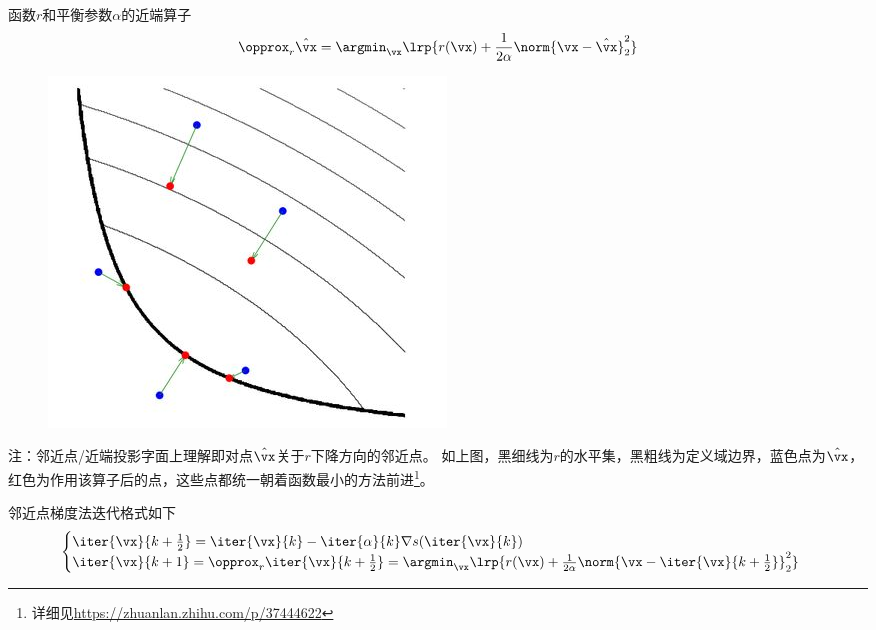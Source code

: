 \begin{definition}
    函数$r$和平衡参数$\alpha$的近端算子
\[\opprox_r \hat{\vx}=\argmin_\vx \lrp{r(\vx)+\frac{1}{2\alpha}\norm{\vx-\hat{\vx}}_2^2}\]
\begin{figure}[H]
    \centering
    \includegraphics[width=0.4\linewidth]{fig/prox.jpg}
\end{figure}
注：邻近点/近端投影字面上理解即对点$\hat{\vx}$关于$r$下降方向的邻近点。
如上图，黑细线为$r$的水平集，黑粗线为定义域边界，蓝色点为$\hat{\vx}$，红色为作用该算子后的点，这些点都统一朝着函数最小的方法前进\footnote{详细见\url{https://zhuanlan.zhihu.com/p/37444622}}。
\end{definition}
邻近点梯度法迭代格式如下
\[\begin{cases}
    \iter{\vx}{k+\frac{1}{2}}=\iter{\vx}{k}-\iter{\alpha}{k}\nabla s(\iter{\vx}{k})\\
    \iter{\vx}{k+1}=\opprox_{r}\iter{\vx}{k+\frac{1}{2}}=\argmin_\vx\lrp{r(\vx)+\frac{1}{2\alpha}\norm{\vx-\iter{\vx}{k+\frac{1}{2}}}_2^2}
\end{cases}\]

